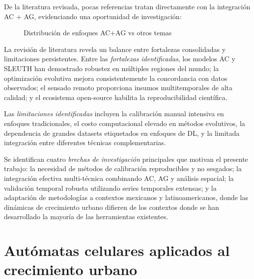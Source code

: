 De la literatura revisada, pocas referencias tratan directamente con la integración AC + AG, evidenciando una oportunidad de investigación:

\begin{figure}[h]
\centering
{}
\caption{Distribución de enfoques AC+AG vs otros temas}
\label{fig:ac_ga_distribution}
\end{figure}

La revisión de literatura revela un balance entre fortalezas consolidadas y limitaciones persistentes. Entre las \textit{fortalezas identificadas}, los modelos AC y SLEUTH han demostrado robustez en múltiples regiones del mundo; la optimización evolutiva mejora consistentemente la concordancia con datos observados; el sensado remoto proporciona insumos multitemporales de alta calidad; y el ecosistema open-source habilita la reproducibilidad científica.

Las \textit{limitaciones identificadas} incluyen la calibración manual intensiva en enfoques tradicionales, el costo computacional elevado en métodos evolutivos, la dependencia de grandes datasets etiquetados en enfoques de DL, y la limitada integración entre diferentes técnicas complementarias.

Se identifican cuatro \textit{brechas de investigación} principales que motivan el presente trabajo: la necesidad de métodos de calibración reproducibles y no sesgados; la integración efectiva multi-técnica combinando AC, AG y análisis espacial; la validación temporal robusta utilizando series temporales extensas; y la adaptación de metodologías a contextos mexicanos y latinoamericanos, donde las dinámicas de crecimiento urbano difieren de los contextos donde se han desarrollado la mayoría de las herramientas existentes.

\section{Autómatas celulares aplicados al crecimiento urbano}


